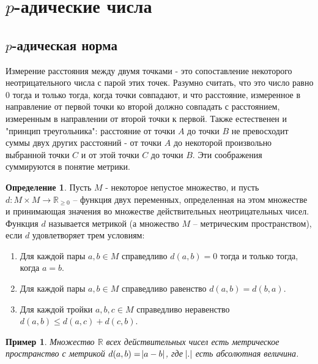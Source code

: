\documentclass[master, och, diploma, times]{sty/SCWorks}
\theoremstyle{plain}
\newtheorem{exmp}{Пример}[section]
\theoremstyle{definition}
\newtheorem{defn}{Определение}[section]
\numberwithin{equation}{section}
\begin{document}
\section{$p$-адические числа}

\subsection{$p$-адическая норма}

Измерение расстояния между двумя точками - это сопоставление некоторого неотрицательного числа с парой этих точек. Разумно считать, что это число равно $0$ тогда и только тогда, когда точки совпадают, и что расстояние, измеренное в направление от первой точки ко второй должно совпадать с расстоянием, измеренным в направлении от второй точки к первой. Также естественен и "принцип треугольника":  расстояние от точки $A$ до точки $B$ не превосходит суммы двух других расстояний - от точки $A$ до некоторой произвольно выбранной точки $C$ и от этой точки $C$ до точки $B$. Эти соображения суммируются в понятие метрики.

\begin{defn}
Пусть $M$ - некоторое непустое множество, и пусть \linebreak ${d: M \times M \rightarrow \mathbb {R}_{\ge0}}$ -- функция двух переменных, определенная на этом множестве и принимающая значения во множестве действительных неотрицательных чисел. Функция $d$ называется метрикой (а множество $M$ -- метрическим пространством), если $d$ удовлетворяет трем условиям:

\begin{enumerate}
	\item Для каждой пары $a, b \in M$ справедливо $d(a, b)=0$ тогда и только тогда, когда $a=b$.
	\item Для каждой пары $a, b \in M$ справедливо равенство $d(a, b) = d(b, a)$.
	\item Для каждой тройки $a, b, c \in M$ справедливо неравенство $d(a, b) \le d(a, c) + d(c, b)$.
\end{enumerate}
\end{defn}

\begin{exmp}
Множество $\mathbb {R}$ всех действительных чисел есть метрическое пространство с метрикой $d(a, b)= \abs{a-b}$, где $\abs{.}$ есть абсолютная величина.
\end{exmp}
\end{document}
